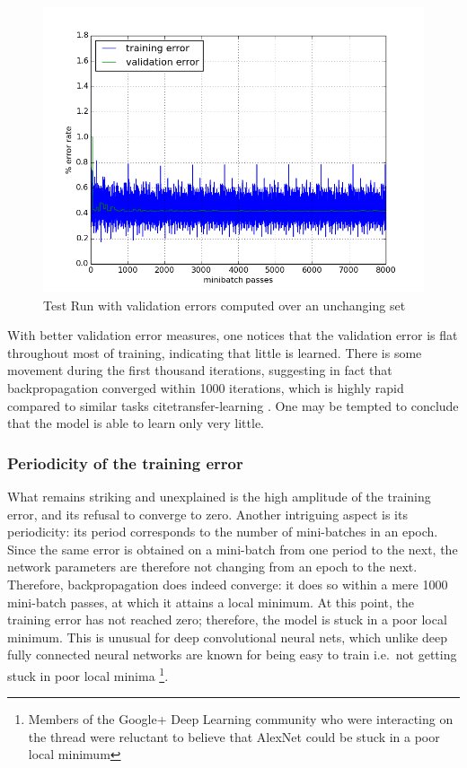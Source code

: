 \documentclass[a4paper,11pt]{article}
\begin{document}
\begin{figure}[h!]
	\centering
	\includegraphics[scale=0.5]{images/increase_test_precision.png}
	\caption{Test Run with validation errors computed over an unchanging set}
\end{figure}

With better validation error measures, one notices that the validation error is flat throughout most of training, indicating that little is learned. There is some movement during the first thousand iterations, suggesting in fact that backpropagation converged within 1000 iterations, which is highly rapid compared to similar tasks \cite{decaf} \cite{fergus_tutorial} cite{transfer-learning} \cite{caffe-website}. One may be tempted to conclude that the model is able to learn only very little.


\subsubsection{Periodicity of the training error}

What remains striking and unexplained is the high amplitude of the training error, and its refusal to converge to zero. Another intriguing aspect is its periodicity: its period corresponds to the number of mini-batches in an epoch. Since the same error is obtained on a mini-batch from one period to the next, the network parameters are therefore not changing from an epoch to the next. Therefore, backpropagation does indeed converge: it does so within a mere 1000 mini-batch passes, at which it attains a local minimum. At this point, the training error has not reached zero; therefore, the model is stuck in a poor local minimum. This is unusual for deep convolutional neural nets, which unlike deep fully connected neural networks are known for being easy to train i.e.\ not getting stuck in poor local minima \cite{DL-book}\footnote{Members of the Google+ Deep Learning community who were interacting on the thread were reluctant to believe that AlexNet could be stuck in a poor local minimum}. 
\end{document}
